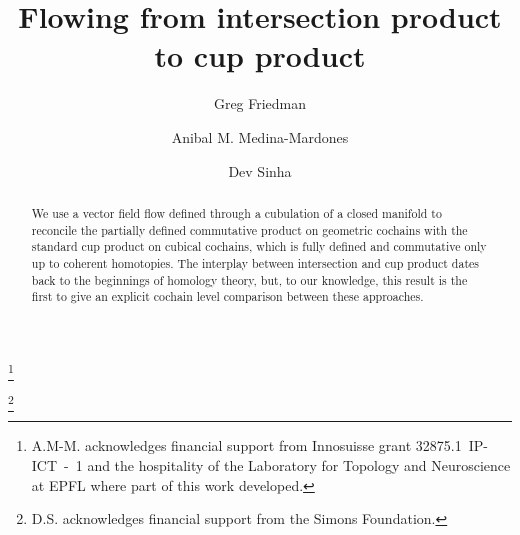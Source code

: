 \documentclass{amsart}
\theoremstyle{definition}
\begin{document}
\title{Flowing from intersection product to cup product}

\author[G. Friedman]{Greg Friedman}
\address{Department of Mathematics, Texas Christian University}

\author[A. Medina-Mardones]{Anibal M. Medina-Mardones}
\address{Max Planck Institute for Mathematics, Bonn, Germany}
\address{Department of Mathematics, University of Notre, Notre Dame, IN, USA}
\thanks{A.M-M. acknowledges financial support from Innosuisse grant \mbox{32875.1 IP-ICT - 1} and the hospitality of the Laboratory for Topology and Neuroscience at EPFL where part of this work developed.}

\author[D. Sinha]{Dev Sinha}
\address{Mathematics Department, University of Oregon}
\thanks{D.S. acknowledges financial support from the Simons Foundation.}


\begin{abstract}
	We use a vector field flow defined through a cubulation of a closed manifold to reconcile the partially defined commutative product on geometric cochains with the standard cup product on cubical cochains, which is fully defined and commutative only up to coherent homotopies. The interplay between intersection and cup product dates back to the beginnings of homology theory, but, to our knowledge, this result is the first to give an explicit cochain level comparison between these approaches.
\end{abstract}

\maketitle
\tableofcontents



\end{document}
